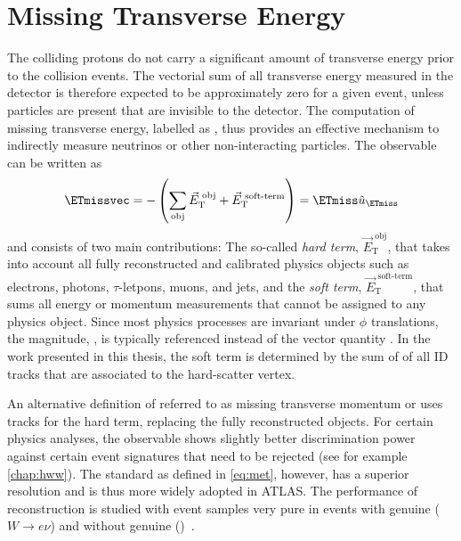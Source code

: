 \section{Missing Transverse Energy}
\label{sec:met}
The colliding protons do not carry a significant amount of transverse energy prior to the collision events.
The vectorial sum of all transverse energy measured in the detector is therefore expected to be approximately zero for a given event, unless particles are present that are invisible to the detector. The computation of missing transverse energy, labelled as \ETmissvec, thus provides an effective mechanism to indirectly measure neutrinos or other non-interacting particles.
The \ETmissvec observable can be written as
\begin{equation}
    \ETmissvec = - \left( \sum_{\text{obj}} \vec{E}_{\text{T}}^\text{ obj} + \vec{E}_{\text{T}}^\text{ soft-term} \right)
    = \ETmiss \hat{u}_{\ETmiss}
    \label{eq:met}
\end{equation}
and consists of two main contributions: The so-called \emph{hard term}, $\vec{E}_{\text{T}}^\text{ obj}$, that takes into account all fully reconstructed and calibrated physics objects such as electrons, photons, $\tau$-letpons, muons, and jets, and the \emph{soft term}, $\vec{E}_{\text{T}}^\text{ soft-term}$, that sums all energy or momentum measurements that cannot be assigned to any physics object.
Since most physics processes are invariant under $\phi$ translations, the magnitude, \ETmiss, is typically referenced instead of the vector quantity \ETmissvec.
In the work presented in this thesis, the soft term is determined by the sum of \pT of all ID tracks that are associated to the hard-scatter vertex.

An alternative definition of \ETmiss referred to as missing transverse momentum or \pTmiss uses tracks for the hard term, replacing the fully reconstructed objects.
For certain physics analyses, the \pTmiss observable shows slightly better discrimination power against certain event signatures that need to be rejected (see for example \cref{chap:hww}). The standard \ETmiss as defined in \cref{eq:met}, however, has a superior resolution and is thus more widely adopted in ATLAS.
The performance of \ETmiss reconstruction is studied with event samples very pure in events with genuine \ETmiss ($W \rightarrow e\nu$) and without genuine \ETmiss (\Zmumu)~\cite{PERF-2016-07}.

